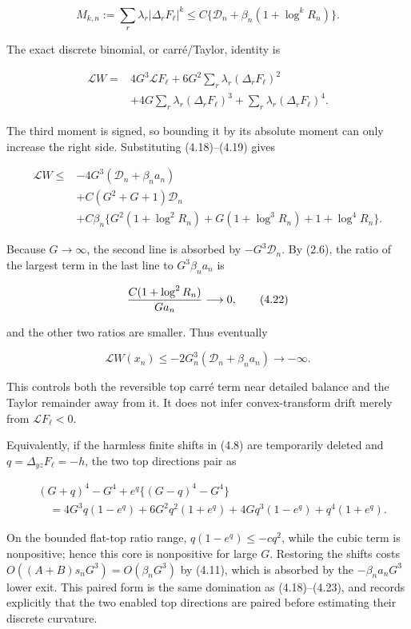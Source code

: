 \[
 M_{k,n}:=\sum_r\lambda_r|\Delta_rF_\ell|^k
 \le C\{\mathcal D_n+\beta_n(1+\log^kR_n)\}.       \tag{4.19}
\]

The exact discrete binomial, or carré/Taylor, identity is

\[
\begin{split}
 \mathcal LW={}&4G^3\mathcal LF_\ell
       +6G^2\sum_r\lambda_r(\Delta_rF_\ell)^2\\
 &+4G\sum_r\lambda_r(\Delta_rF_\ell)^3
       +\sum_r\lambda_r(\Delta_rF_\ell)^4.
\end{split}\tag{4.20}
\]

The third moment is signed, so bounding it by its absolute moment can
only increase the right side. Substituting (4.18)--(4.19) gives

\[
\begin{split}
 \mathcal LW\le{}&-4G^3(\mathcal D_n+\beta_na_n)\\
 &+C(G^2+G+1)\mathcal D_n\\
 &+C\beta_n\{G^2(1+\log^2R_n)
      +G(1+\log^3R_n)+1+\log^4R_n\}.
\end{split}\tag{4.21}
\]

Because \(G\to\infty\), the second line is absorbed by
\(-G^3\mathcal D_n\). By (2.6), the ratio of the largest term in the
last line to \(G^3\beta_na_n\) is

\[
 {C(1+\log^2R_n)\over G a_n}\longrightarrow0,      \tag{4.22}
\]

and the other two ratios are smaller. Thus eventually

\[
 \mathcal LW(x_n)
 \le-2G_n^3(\mathcal D_n+\beta_na_n)\to-\infty.     \tag{4.23}
\]

This controls both the reversible top carré term near detailed balance
and the Taylor remainder away from it. It does not infer
convex-transform drift merely from \(\mathcal LF_\ell<0\).

Equivalently, if the harmless finite shifts in (4.8) are temporarily
deleted and \(q=\Delta_{yz}F_\ell=-h\), the two top directions pair as

\[
\begin{split}
 &(G+q)^4-G^4+e^q\{(G-q)^4-G^4\}\\
 &\quad=4G^3q(1-e^q)+6G^2q^2(1+e^q)
       +4Gq^3(1-e^q)+q^4(1+e^q).
\end{split}\tag{4.24}
\]

On the bounded flat-top ratio range, \(q(1-e^q)\le-cq^2\), while the
cubic term is nonpositive; hence this core is nonpositive for large
\(G\). Restoring the shifts costs \(O((A+B)s_nG^3)=O(\beta_nG^3)\) by
(4.11), which is absorbed by the \(-\beta_na_nG^3\) lower exit. This
paired form is the same domination as (4.18)--(4.23), and records
explicitly that the two enabled top directions are paired before
estimating their discrete curvature.

